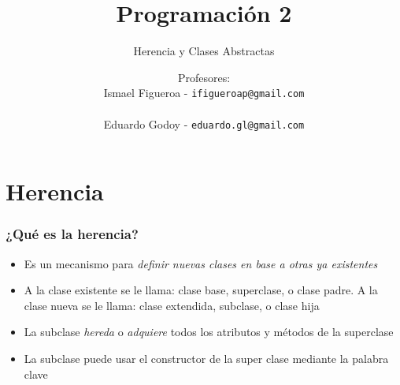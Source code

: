 \documentclass{beamer}
\title[\textbf{Programación 2}]{\textbf{Programación 2}}
\subtitle{Herencia y Clases Abstractas}
\author[IF-EG]
{Profesores:\\
  Ismael Figueroa -  \texttt{\small ifigueroap@gmail.com} \\
  \vspace{0.5mm} \\
  Eduardo Godoy - \texttt{\small eduardo.gl@gmail.com}
}
\institute[Universidad de Valparaíso]
\date{}
\begin{document}
\begin{frame}
  \titlepage
\end{frame}

\section{Herencia}

\begin{frame}
  \frametitle{¿Qué es la herencia?}
  \begin{itemize}
  \item Es un mecanismo para \emph{definir nuevas clases en base a
      otras ya existentes}
    
  \item A la clase existente se le llama: clase base, superclase, o
    clase padre. A la clase nueva se le llama: clase extendida,
    subclase, o clase hija
    
  \item La subclase \emph{hereda} o \emph{adquiere} todos los
    atributos y métodos de la superclase
    
  \item La subclase puede usar el constructor de la super clase
    mediante la palabra clave 
    
  \end{itemize}
\end{frame}
\end{document}
